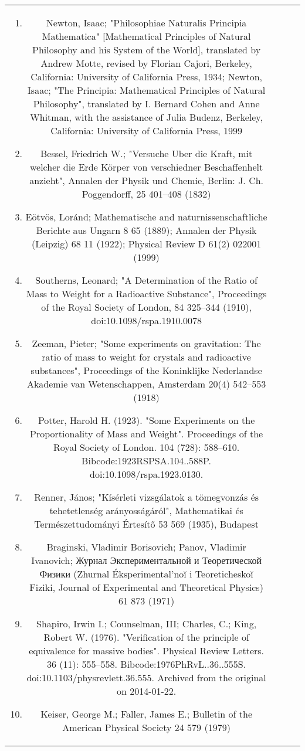 \begin{table}[ht]
\begin{tabular}{|c|c|c|c}
\begin{enumerate}
\item Newton, Isaac; "Philosophiae Naturalis Principia Mathematica" [Mathematical Principles of Natural Philosophy and his System of the World], translated by Andrew Motte, revised by Florian Cajori, Berkeley, California: University of California Press, 1934; Newton, Isaac; "The Principia: Mathematical Principles of Natural Philosophy", translated by I. Bernard Cohen and Anne Whitman, with the assistance of Julia Budenz, Berkeley, California: University of California Press, 1999
\item Bessel, Friedrich W.; "Versuche Uber die Kraft, mit welcher die Erde Körper von verschiedner Beschaffenhelt anzieht", Annalen der Physik und Chemie, Berlin: J. Ch. Poggendorff, 25 401–408 (1832)
\item Eötvös, Loránd; Mathematische and naturnissenschaftliche Berichte aus Ungarn 8 65 (1889); Annalen der Physik (Leipzig) 68 11 (1922); Physical Review D 61(2) 022001 (1999)
\item Southerns, Leonard; "A Determination of the Ratio of Mass to Weight for a Radioactive Substance", Proceedings of the Royal Society of London, 84 325–344 (1910), doi:10.1098/rspa.1910.0078
\item Zeeman, Pieter; "Some experiments on gravitation: The ratio of mass to weight for crystals and radioactive substances", Proceedings of the Koninklijke Nederlandse Akademie van Wetenschappen, Amsterdam 20(4) 542–553 (1918)
\item Potter, Harold H. (1923). "Some Experiments on the Proportionality of Mass and Weight". Proceedings of the Royal Society of London. 104 (728): 588–610. Bibcode:1923RSPSA.104..588P. doi:10.1098/rspa.1923.0130.
\item Renner, János; "Kísérleti vizsgálatok a tömegvonzás és tehetetlenség arányosságáról", Mathematikai és Természettudományi Értesítő 53 569 (1935), Budapest
\item Braginski, Vladimir Borisovich; Panov, Vladimir Ivanovich; Журнал Экспериментальной и Теоретической Физики (Zhurnal Éksperimental’noĭ i Teoreticheskoĭ Fiziki, Journal of Experimental and Theoretical Physics) 61 873 (1971)
\item Shapiro, Irwin I.; Counselman, III; Charles, C.; King, Robert W. (1976). "Verification of the principle of equivalence for massive bodies". Physical Review Letters. 36 (11): 555–558. Bibcode:1976PhRvL..36..555S. doi:10.1103/physrevlett.36.555. Archived from the original on 2014-01-22.
\item Keiser, George M.; Faller, James E.; Bulletin of the American Physical Society 24 579 (1979)

\end{enumerate}
\end{tabular}
\end{table}
